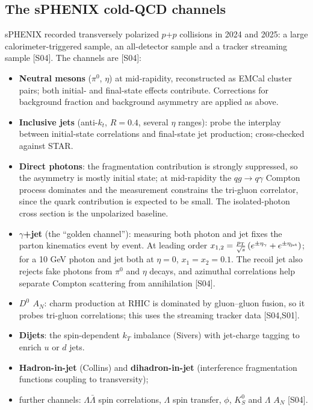 \documentclass[11pt,letterpaper]{article}
\newcommand{\pT}{p_{\mathrm{T}}}
\begin{document}
\subsection{The sPHENIX cold-QCD channels}
sPHENIX recorded transversely polarized $p$+$p$ collisions in 2024 and 2025: a large calorimeter-triggered sample, an
all-detector sample and a tracker streaming sample [S04]. The channels are [S04]:
\begin{itemize}
\item \textbf{Neutral mesons} ($\pi^0$, $\eta$) at mid-rapidity, reconstructed as EMCal cluster pairs; both initial- and
final-state effects contribute. Corrections for background fraction and background asymmetry
are applied as above.
\item \textbf{Inclusive jets} (anti-$k_t$, $R=0.4$, several $\eta$ ranges): probe the interplay between initial-state
correlations and final-state jet production; cross-checked against STAR.
\item \textbf{Direct photons}: the fragmentation contribution is strongly suppressed, so the asymmetry is mostly
initial state; at mid-rapidity the $qg\to q\gamma$ Compton process dominates and the measurement constrains the tri-gluon
correlator, since the quark contribution is expected to be small. The isolated-photon cross section \cite{isogamma} is
the unpolarized baseline.
\item \textbf{$\gamma$+jet} (the ``golden channel''): measuring both photon and jet fixes the parton kinematics event by
event. At leading order $x_{1,2}=\frac{\pT}{\sqrt s}\left(e^{\pm\eta_\gamma}+e^{\pm\eta_{\rm jet}}\right)$; for a 10 GeV photon and
jet both at $\eta=0$, $x_1=x_2=0.1$. The recoil jet also rejects fake photons from $\pi^0$ and $\eta$ decays, and azimuthal
correlations help separate Compton scattering from annihilation [S04].
\item \textbf{$D^0$ $A_N$}: charm production at RHIC is dominated by gluon--gluon fusion, so it probes tri-gluon
correlations; this uses the streaming tracker data [S04,S01].
\item \textbf{Dijets}: the spin-dependent $k_T$ imbalance (Sivers) with jet-charge tagging to enrich $u$ or $d$ jets.
\item \textbf{Hadron-in-jet} (Collins) and \textbf{dihadron-in-jet} (interference fragmentation functions coupling to transversity);
\item further channels: $\Lambda\bar\Lambda$ spin correlations, $\Lambda$ spin transfer, $\phi$, $K^0_S$ and $\Lambda$ $A_N$ [S04].
\end{itemize}
\end{document}
